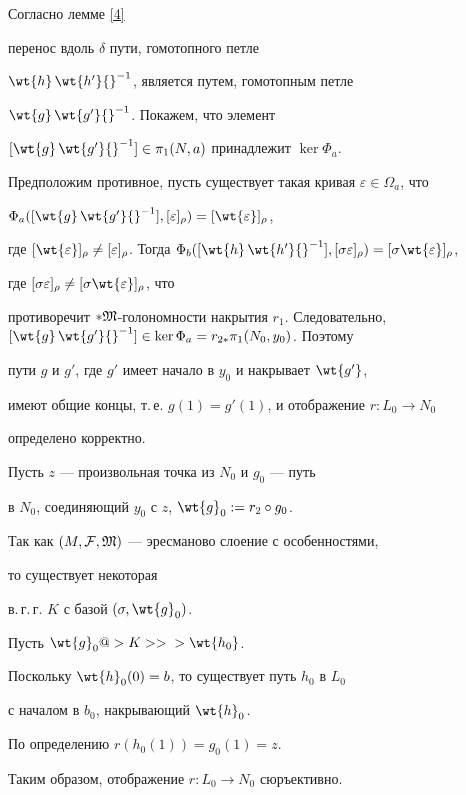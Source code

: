 \begin{pf}
Согласно лемме \ref{4}


перенос вдоль $\delta$ пути, гомотопного петле


$\wt{h}\,\wt{h'}{}^{-1}$, является путем, гомотопным петле


$\wt{g}\,\wt{g'}{}^{-1}$. Покажем, что элемент


$[\wt{g}\,\wt{g'}{}^{-1}]\in\pi_1(N,a)$ принадлежит $\ker\Phi_a$.


Предположим противное, пусть существует такая кривая $\varepsilon\in\Omega_a$, что


$\Phi_a([\wt{g}\, \wt{g'}{}^{-1}],[\varepsilon]_{\rho})=[\wt{\varepsilon}]_{\rho}$,


где $[\wt{\varepsilon}]_{\rho}\neq [\varepsilon]_{\rho}$. Тогда $\Phi_b([\wt{h}\,


\wt{h'}{}^{-1}],[\sigma\varepsilon]_{\rho})=[\sigma\wt{\varepsilon}]_{\rho}$,


где $[\sigma\varepsilon]_{\rho}\neq [\sigma\wt{\varepsilon}]_{\rho}$, что


противоречит $*\frak M$-голономности накрытия  $r_1$. Следовательно, $[\wt{g}\,


\wt{g'}{}^{-1}]\in\ker\Phi_a=r_{2*}\pi_1(N_0,y_0)$. Поэтому


пути $g$ и $g'$, где $g'$ имеет начало в $y_0$ и накрывает $\wt{g'}$,


имеют общие концы, т.\,е. $g(1)=g'(1)$, и отображение $r: L_0\to N_0$


определено корректно.





Пусть $z$ --- произвольная точка из $N_0$ и $g_0$ --- путь


в $N_0$, соединяющий $y_0$ с $z$, $\wt{g}_0:=r_2\circ g_0$.


Так как $(M,{\cal F},\frak M)$ --- эресманово слоение с особенностями,


то существует некоторая


в.\,г.\,г. $K$ с базой $(\sigma,\wt{g}_0)$.


Пусть $\wt{g}_0@>{K}>>{}>\wt{h_0}$.


Поскольку $\wt{h}_0(0)=b$, то существует путь $h_0$ в $L_0$


с началом в $b_0$, накрывающий $\wt{h}_0$.


По определению $r(h_0(1))=g_0(1)=z$.


Таким образом, отображение $r: L_0\to N_0$ сюръективно.






\end{pf}
